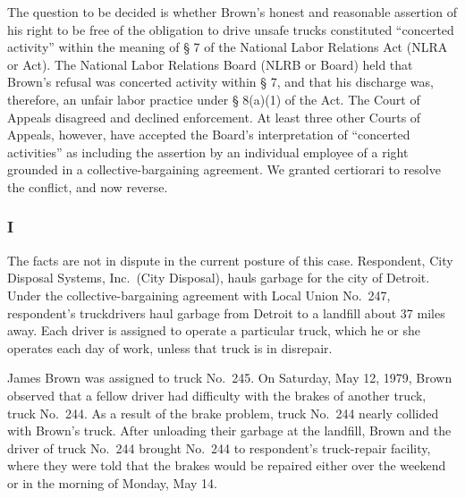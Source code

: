 \documentclass[
  letterpaper,
  11pt,
  DIV=9,
  openright]{scrbook}
\begin{document}
The question to be decided is whether Brown's honest and reasonable
assertion of his right to be free of the obligation to drive unsafe
trucks constituted ``concerted activity'' within the meaning of § 7 of
the National Labor Relations Act (NLRA or Act). The National Labor
Relations Board (NLRB or Board) held that Brown's refusal was concerted
activity within § 7, and that his discharge was, therefore, an unfair
labor practice under § 8(a)(1) of the Act. The Court of Appeals
disagreed and declined enforcement. At least three other Courts of
Appeals, however, have accepted the Board's interpretation of
``concerted activities'' as including the assertion by an individual
employee of a right grounded in a collective-bargaining agreement. We
granted certiorari to resolve the conflict, and now reverse.

\subsubsection{I}\label{i}

The facts are not in dispute in the current posture of this case.
Respondent, City Disposal Systems, Inc.~(City Disposal), hauls garbage
for the city of Detroit. Under the collective-bargaining agreement with
Local Union No.~247, respondent's truckdrivers haul garbage from Detroit
to a landfill about 37 miles away. Each driver is assigned to operate a
particular truck, which he or she operates each day of work, unless that
truck is in disrepair.

James Brown was assigned to truck No.~245. On Saturday, May 12, 1979,
Brown observed that a fellow driver had difficulty with the brakes of
another truck, truck No.~244. As a result of the brake problem, truck
No.~244 nearly collided with Brown's truck. After unloading their
garbage at the landfill, Brown and the driver of truck No.~244 brought
No.~244 to respondent's truck-repair facility, where they were told that
the brakes would be repaired either over the weekend or in the morning
of Monday, May 14.
\end{document}
